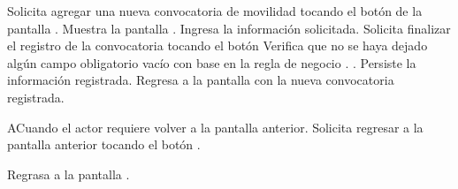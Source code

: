 	\begin{UCtrayectoria}
		\UCpaso [\UCactor] Solicita agregar una nueva convocatoria de movilidad tocando el botón  de la pantalla . 
		\UCpaso [\UCsist] Muestra la pantalla .
		\UCpaso [\UCactor] Ingresa la información solicitada. \label{CUAC-7.5:Datos}
		\UCpaso [\UCactor] Solicita finalizar el registro de la convocatoria tocando el botón 
		\UCpaso [\UCsist] Verifica que no se haya dejado algún campo obligatorio vacío con base en la regla de negocio . .
		\UCpaso [\UCsist] Persiste la información registrada. 
		\UCpaso [\UCsist] Regresa a la pantalla  con la nueva convocatoria registrada.
	\end{UCtrayectoria}
	
	\begin{UCtrayectoriaA}{A}{Cuando el actor requiere volver a la pantalla anterior.}
		\UCpaso[\UCactor] Solicita regresar a la pantalla anterior tocando el botón .
		
		\UCpaso [\UCsist] Regrasa a la pantalla .
	\end{UCtrayectoriaA}
	